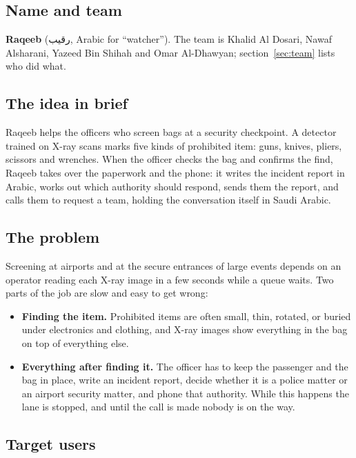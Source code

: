 \documentclass[11pt,a4paper]{article}
\newcommand{\ar}[1]{\textarabic{#1}}
\begin{document}
\subsection{Name and team}

\textbf{Raqeeb} (\ar{رقيب}, Arabic for ``watcher''). The team is Khalid Al Dosari, Nawaf Alsharani,
Yazeed Bin Shihah and Omar Al-Dhawyan; section~\ref{sec:team} lists who did what.

\subsection{The idea in brief}

Raqeeb helps the officers who screen bags at a security checkpoint. A detector trained on X-ray
scans marks five kinds of prohibited item: guns, knives, pliers, scissors and wrenches. When the
officer checks the bag and confirms the find, Raqeeb takes over the paperwork and the phone: it
writes the incident report in Arabic, works out which authority should respond, sends them the
report, and calls them to request a team, holding the conversation itself in Saudi Arabic.

\subsection{The problem}

Screening at airports and at the secure entrances of large events depends on an operator reading
each X-ray image in a few seconds while a queue waits. Two parts of the job are slow and easy to
get wrong:

\begin{itemize}
  \item \textbf{Finding the item.} Prohibited items are often small, thin, rotated, or buried under
        electronics and clothing, and X-ray images show everything in the bag on top of everything
        else.
  \item \textbf{Everything after finding it.} The officer has to keep the passenger and the bag in
        place, write an incident report, decide whether it is a police matter or an airport security
        matter, and phone that authority. While this happens the lane is stopped, and until the call
        is made nobody is on the way.
\end{itemize}

\subsection{Target users}
\end{document}
